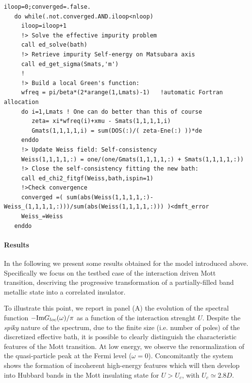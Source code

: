 \documentclass[edipack2.tex]{subfiles}
\begin{document}
\begin{lstlisting}[style=fstyle,numbers=none,basicstyle={\scriptsize\ttfamily}]
iloop=0;converged=.false.
   do while(.not.converged.AND.iloop<nloop)
     iloop=iloop+1     
     !> Solve the effective impurity problem
     call ed_solve(bath)     
     !> Retrieve impurity Self-energy on Matsubara axis
     call ed_get_sigma(Smats,'m')
     !
     !> Build a local Green's function:
     wfreq = pi/beta*(2*arange(1,Lmats)-1)   !automatic Fortran allocation
     do i=1,Lmats ! One can do better than this of course 
        zeta= xi*wfreq(i)+xmu - Smats(1,1,1,1,i)
        Gmats(1,1,1,1,i) = sum(DOS(:)/( zeta-Ene(:) ))*de  
     enddo
     !> Update Weiss field: Self-consistency
     Weiss(1,1,1,1,:) = one/(one/Gmats(1,1,1,1,:) + Smats(1,1,1,1,:))
     !> Close the self-consistency fitting the new bath:
     call ed_chi2_fitgf(Weiss,bath,ispin=1)     
     !>Check convergence
     converged =( sum(abs(Weiss(1,1,1,1,:)-Weiss_(1,1,1,1,:)))/sum(abs(Weiss(1,1,1,1,:))) )<dmft_error
     Weiss_=Weiss     
   enddo
\end{lstlisting}


\paragraph{Results}
In the following we present some results obtained for the model
introduced above. Specifically we focus on the testbed case of the interaction
driven Mott transition, descriving the progressive
transformation of a partially-filled band metallic state into a correlated insulator. 

To illustrate this point, we report in panel (A) the evolution of
the spectral function $-{\rm Im}G_{loc}(\omega)/\pi$ as a function of
the interaction strenght $U$. Despite the {\it spiky} nature of the spectrum, due to the
finite size (i.e. number of poles) of the discretized effective bath,
it is possible to clearly distinguish the characteristic features of
the Mott transition. At low energy, we observe the renormalization of the 
quasi-particle peak at the Fermi level ($\omega=0$). Concomitantly the
system shows the formation of incoherent  high-energy features which
will then develop into Hubbard bands in the Mott insulating state for $U>U_c$, with $U_c\simeq 2.8D$. 
\end{document}
